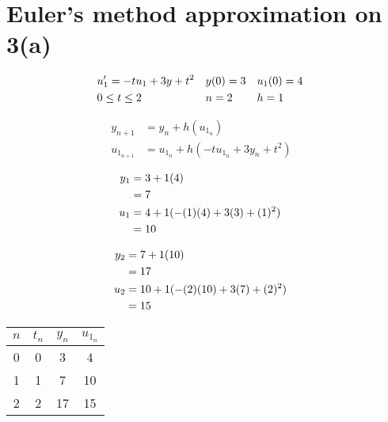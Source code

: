 \section{Euler's method approximation on 3(a)}
	\begin{align}
		&u_{1}' = -tu_{1} + 3y + t^{2}&
		&y(0) = 3&
		&u_{1}(0) = 4&
		\notag \\
		&0 \leq t \leq 2&
		&n = 2&
		&h = 1&
	\end{align}

	\begin{align}
		y_{n+1} &= y_{n} + h(u_{1_{n}})& \\
		u_{1_{n+1}} &= u_{1_{n}} + h(-tu_{1_{n}} + 3y_{n} + t^{2})&
	\end{align}

	\begin{align}
		y_{1} &= 3 + 1(4)& \notag \\
		&= 7& \\
		u_{1} &= 4 + 1(-(1)(4) + 3(3) + (1)^{2})& \notag \\
		&= 10&
	\end{align}

	\begin{align}
		y_{2} &= 7 + 1(10)& \notag \\
		&= 17& \\
		u_{2} &= 10 + 1(-(2)(10) + 3(7) + (2)^{2})& \notag \\
		&= 15&
	\end{align}

	\begin{table}[H]
		\centering
		\begin{tabular}{|c|c|c|c|}
			\hline
			$n$ & $t_{n}$ & $y_{n}$ & $u_{1_{n}}$ \\ \hline
			0 & 0 & 3 & 4 \\ \hline
			1 & 1 & 7 & 10 \\ \hline
			2 & 2 & 17 & 15 \\ \hline
		\end{tabular}
	\end{table}
